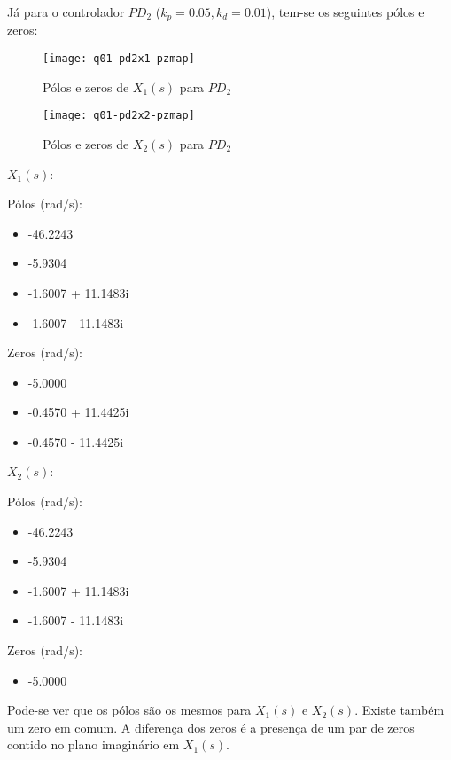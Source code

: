 \documentclass[a4paper,11pt]{article}
\begin{document}
\pagebreak

Já para o controlador $PD_2$ ($k_p = 0.05, k_d = 0.01$), tem-se os seguintes
pólos e zeros:

\begin{figure}[H]
\centering
\texttt{[image: q01-pd2x1-pzmap]}
\caption{Pólos e zeros de $X_1\left(s\right)$ para $PD_2$}
\end{figure}

\begin{figure}[H]
\centering
\texttt{[image: q01-pd2x2-pzmap]}
\caption{Pólos e zeros de $X_2\left(s\right)$ para $PD_2$}
\end{figure}

$X_1\left(s\right)$:

\begin{multicols}{2}
    Pólos (rad/s):
    \begin{itemize}
        \item -46.2243
        \item -5.9304
        \item -1.6007 + 11.1483i
        \item -1.6007 - 11.1483i
    \end{itemize}
\columnbreak
    Zeros (rad/s):
    \begin{itemize}
        \item -5.0000
        \item -0.4570 + 11.4425i
        \item -0.4570 - 11.4425i
    \end{itemize}
\end{multicols}

$X_2\left(s\right)$:

\begin{multicols}{2}
    Pólos (rad/s):
    \begin{itemize}
        \item -46.2243
        \item -5.9304
        \item -1.6007 + 11.1483i
        \item -1.6007 - 11.1483i
    \end{itemize}
\columnbreak
    Zeros (rad/s):
    \begin{itemize}
        \item -5.0000
    \end{itemize}
\end{multicols}

Pode-se ver que os pólos são os mesmos para $X_1\left(s\right)$ e
$X_2\left(s\right)$. Existe também um zero em comum. A diferença dos zeros é a
presença de um par de zeros contido no plano imaginário em $X_1\left(s\right)$.
\end{document}
